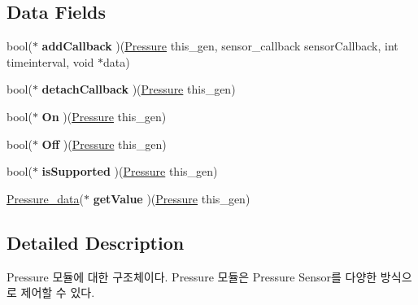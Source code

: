 \subsection*{Data Fields}
\begin{DoxyCompactItemize}
\item 
\hypertarget{struct__Pressure_a34f0a13161a6d73a82b9cae7319ddf50}{bool($\ast$ {\bfseries add\-Callback} )(\hyperlink{struct__Pressure}{Pressure} this\-\_\-gen, sensor\-\_\-callback sensor\-Callback, int timeinterval, void $\ast$data)}\label{struct__Pressure_a34f0a13161a6d73a82b9cae7319ddf50}

\item 
\hypertarget{struct__Pressure_a7345c6a3cb4c89f7c1d8c7d8bdb91e80}{bool($\ast$ {\bfseries detach\-Callback} )(\hyperlink{struct__Pressure}{Pressure} this\-\_\-gen)}\label{struct__Pressure_a7345c6a3cb4c89f7c1d8c7d8bdb91e80}

\item 
\hypertarget{struct__Pressure_a76a894862d359f094d24add3cabae5ea}{bool($\ast$ {\bfseries On} )(\hyperlink{struct__Pressure}{Pressure} this\-\_\-gen)}\label{struct__Pressure_a76a894862d359f094d24add3cabae5ea}

\item 
\hypertarget{struct__Pressure_a30cf8913cc8a1712dc76eff8a73ced94}{bool($\ast$ {\bfseries Off} )(\hyperlink{struct__Pressure}{Pressure} this\-\_\-gen)}\label{struct__Pressure_a30cf8913cc8a1712dc76eff8a73ced94}

\item 
\hypertarget{struct__Pressure_af2099f6f9efc1f7213acfd420ea7b8c6}{bool($\ast$ {\bfseries is\-Supported} )(\hyperlink{struct__Pressure}{Pressure} this\-\_\-gen)}\label{struct__Pressure_af2099f6f9efc1f7213acfd420ea7b8c6}

\item 
\hypertarget{struct__Pressure_a9739a7d1b596639f720e0fbb2dd8f064}{\hyperlink{Sensor_8h_d4/dbb/struct__Pressure__data}{Pressure\-\_\-data}($\ast$ {\bfseries get\-Value} )(\hyperlink{struct__Pressure}{Pressure} this\-\_\-gen)}\label{struct__Pressure_a9739a7d1b596639f720e0fbb2dd8f064}

\end{DoxyCompactItemize}


\subsection{Detailed Description}
Pressure 모듈에 대한 구조체이다. Pressure 모듈은 Pressure Sensor를 다양한 방식으로 제어할 수 있다. 

